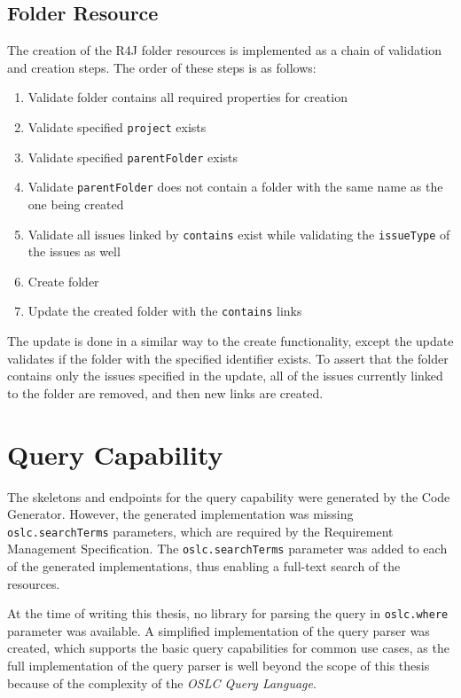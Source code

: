 \subsection*{Folder Resource}
The creation of the R4J folder resources is implemented as a chain of validation and creation steps. The order of these steps is as follows:

\begin{enumerate}
  \item Validate folder contains all required properties for creation
  \item Validate specified \texttt{project} exists
  \item Validate specified \texttt{parentFolder} exists
  \item Validate \texttt{parentFolder} does not contain a folder with the same name as the one being created
  \item Validate all issues linked by \texttt{contains} exist while validating the \texttt{issueType} of the issues as well
  \item Create folder
  \item Update the created folder with the \texttt{contains} links
\end{enumerate}

The update is done in a similar way to the create functionality, except the update validates if the folder with the specified identifier exists. To assert that the folder contains only the issues specified in the update, all of the issues currently linked to the folder are removed, and then new links are created.

\section{Query Capability}
The skeletons and endpoints for the query capability were generated by the Code Generator. However, the generated implementation was missing \texttt{oslc.searchTerms} parameters, which are required by the Requirement Management Specification. The \texttt{oslc.searchTerms} parameter was added to each of the generated implementations, thus enabling a full-text search of the resources.

At the time of writing this thesis, no library for parsing the query in \texttt{oslc.where} parameter was available. A simplified implementation of the query parser was created, which supports the basic query capabilities for common use cases, as the full implementation of the query parser is well beyond the scope of this thesis because of the complexity of the \emph{OSLC Query Language}.

